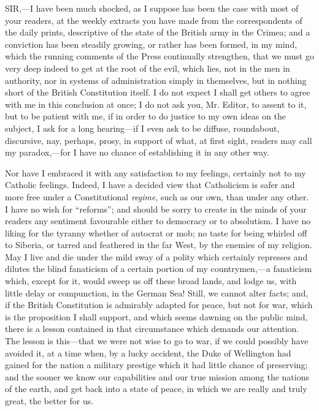 SIR,—I
have been much shocked, as I suppose has been the case with most of
your readers, at the weekly extracts you have made from the
correspondents of the daily prints, descriptive of the state of the
British army in the Crimea; and a conviction has been steadily
growing, or rather has been formed, in my mind, which the running
comments of the Press continually strengthen, that we must go very
deep indeed to get at the root of the evil, which lies, not in the men
in authority, nor in systems of administration simply in themselves,
but in nothing short of the British Constitution itself. I do not
expect I shall get others to agree with me in this conclusion at once;
I do not ask you, Mr. Editor, to assent to it, but to be patient with
me, if in order to do justice to my own ideas on the subject, I ask
for a long hearing—if I even ask to be diffuse, roundabout,
discursive, nay, perhaps, prosy, in support of what, at first sight,
readers may call my paradox,—for I have no chance of establishing it
in any other way.

Nor have I embraced it with any satisfaction to
my feelings, certainly not to my Catholic feelings. Indeed, I have a
decided view that Catholicism is safer and more free under a
Constitutional \emph{regime}, such as our own,
than under any other. I have no wish for ``reforms''; and should be
sorry to create in the minds of your readers any sentiment favourable
either to democracy or to absolutism. I have no liking for the tyranny
whether of autocrat or mob; no taste for being whirled off to Siberia,
or tarred and feathered in the far West, by the enemies of my
religion. May I live and die under the mild sway of a polity which
certainly represses and dilutes the blind fanaticism of a certain
portion of my countrymen,—a fanaticism which, except for it, would
sweep us off these broad lands, and lodge us, with little delay or
compunction, in the German Sea! Still, we cannot alter facts; and, if
the British Constitution is admirably adapted for peace, but not for
war, which is the proposition I shall support, and which seems dawning
on the public mind, there is a lesson contained in that circumstance
which demands our attention. The lesson is this—that we were
not wise to go to war, if we could possibly have avoided it, at a time
when, by a lucky accident, the Duke of Wellington had gained for the
nation a military prestige which it had little chance of preserving;
and the sooner we know our capabilities and our true mission among the
nations of the earth, and get back into a state of peace, in which we
are really and truly great, the better for us.

